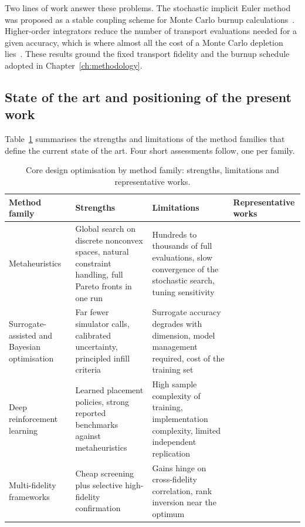 Two lines of work answer these problems. The stochastic implicit Euler
method was proposed as a stable coupling scheme for Monte Carlo burnup
calculations~\cite{dufek_2013_sie}. Higher-order integrators reduce the
number of transport evaluations needed for a given accuracy, which is
where almost all the cost of a Monte Carlo depletion lies~\cite{josey_2017}.
These results ground the fixed transport fidelity and the burnup
schedule adopted in Chapter~\ref{ch:methodology}.

\subsection{State of the art and positioning of the present work}
\label{sec:lit-opt-sota}

Table~\ref{tab:lit-opt-sota} summarises the strengths and limitations
of the method families that define the current state of the art. Four
short assessments follow, one per family.

\begin{table}[htbp]
  \centering
  \caption{Core design optimisation by method family: strengths, limitations and representative works.}
  \label{tab:lit-opt-sota}
  \footnotesize
  \begin{tabular}{@{}>{\raggedright\arraybackslash}p{}>{\raggedright\arraybackslash}p{}%
                  >{\raggedright\arraybackslash}p{}>{\raggedright\arraybackslash}p{}@{}}
    \toprule
    Method family & Strengths & Limitations & Representative works \\
    \midrule
    Metaheuristics &
    Global search on discrete nonconvex spaces, natural constraint
    handling, full Pareto fronts in one run &
    Hundreds to thousands of full evaluations, slow convergence of the
    stochastic search, tuning sensitivity &
    \cite{kropaczek_turinsky_1991,parks_1996,deb_nsga2_2002} \\
    \addlinespace
    Surrogate-assisted and Bayesian optimisation &
    Far fewer simulator calls, calibrated uncertainty, principled
    infill criteria &
    Surrogate accuracy degrades with dimension, model management
    required, cost of the training set &
    \cite{jin_2011,rasmussen_gp_2006,whyte_2020} \\
    \addlinespace
    Deep reinforcement learning &
    Learned placement policies, strong reported benchmarks against
    metaheuristics &
    High sample complexity of training, implementation complexity, limited
    independent replication &
    \cite{radaideh_2021_rl,seurin_2024_pearl} \\
    \addlinespace
    Multi-fidelity frameworks &
    Cheap screening plus selective high-fidelity confirmation &
    Gains hinge on cross-fidelity correlation, rank inversion near the
    optimum &
    \cite{kennedy_ohagan_2000} \\
    \bottomrule
  \end{tabular}
\end{table}

